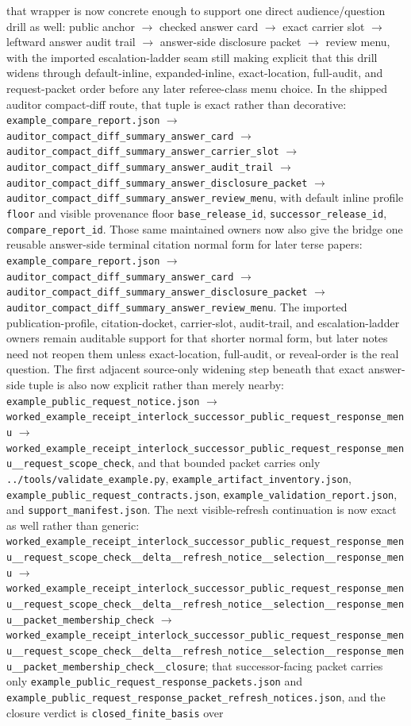 \documentclass[11pt]{article}
\begin{document}
that wrapper is now concrete enough to support one direct audience/question drill as well: public anchor $\to$ checked answer card $\to$ exact carrier slot $\to$ leftward answer audit trail $\to$ answer-side disclosure packet $\to$ review menu, with the imported escalation-ladder seam still making explicit that this drill widens through default-inline, expanded-inline, exact-location, full-audit, and request-packet order before any later referee-class menu choice. In the shipped auditor compact-diff route, that tuple is exact rather than decorative: \nolinkurl{example_compare_report.json} $\to$ \texttt{auditor\_compact\_diff\_summary\_answer\_card} $\to$ \texttt{auditor\_compact\_diff\_summary\_answer\_carrier\_slot} $\to$ \texttt{auditor\_compact\_diff\_summary\_answer\_audit\_trail} $\to$ \texttt{auditor\_compact\_diff\_summary\_answer\_disclosure\_packet} $\to$ \texttt{auditor\_compact\_diff\_summary\_answer\_review\_menu}, with default inline profile \texttt{floor} and visible provenance floor \texttt{base\_release\_id}, \texttt{successor\_release\_id}, \texttt{compare\_report\_id}. Those same maintained owners now also give the bridge one reusable answer-side terminal citation normal form for later terse papers: \nolinkurl{example_compare_report.json} $\to$ \texttt{auditor\_compact\_diff\_summary\_answer\_card} $\to$ \texttt{auditor\_compact\_diff\_summary\_answer\_disclosure\_packet} $\to$ \texttt{auditor\_compact\_diff\_summary\_answer\_review\_menu}. The imported publication-profile, citation-docket, carrier-slot, audit-trail, and escalation-ladder owners remain auditable support for that shorter normal form, but later notes need not reopen them unless exact-location, full-audit, or reveal-order is the real question. The first adjacent source-only widening step beneath that exact answer-side tuple is also now explicit rather than merely nearby: \nolinkurl{example_public_request_notice.json} $\to$ \texttt{worked\_example\_receipt\_interlock\_successor\_public\_request\_response\_menu} $\to$ \texttt{worked\_example\_receipt\_interlock\_successor\_public\_request\_response\_menu\_\_request\_scope\_check}, and that bounded packet carries only \nolinkurl{../tools/validate_example.py}, \nolinkurl{example_artifact_inventory.json}, \nolinkurl{example_public_request_contracts.json}, \nolinkurl{example_validation_report.json}, and \nolinkurl{support_manifest.json}. The next visible-refresh continuation is now exact as well rather than generic: \texttt{worked\_example\_receipt\_interlock\_successor\_public\_request\_response\_menu\_\_request\_scope\_check\_\_delta\_\_refresh\_notice\_\_selection\_\_response\_menu} $\to$ \texttt{worked\_example\_receipt\_interlock\_successor\_public\_request\_response\_menu\_\_request\_scope\_check\_\_delta\_\_refresh\_notice\_\_selection\_\_response\_menu\_\_packet\_membership\_check} $\to$ \texttt{worked\_example\_receipt\_interlock\_successor\_public\_request\_response\_menu\_\_request\_scope\_check\_\_delta\_\_refresh\_notice\_\_selection\_\_response\_menu\_\_packet\_membership\_check\_\_closure}; that successor-facing packet carries only \nolinkurl{example_public_request_response_packets.json} and \nolinkurl{example_public_request_response_packet_refresh_notices.json}, and the closure verdict is \texttt{closed\_finite\_basis} over 
\end{document}
